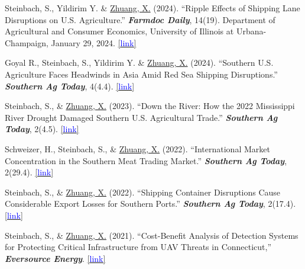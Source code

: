 \documentclass[10.5 pt,letterpaper]{article}
\renewenvironment{itemize}{
	\begin{list}{}{
			\setlength{\leftmargin}{1.5em}
		}
	}{
	\end{list}
}
\begin{document}
\begin{itemize}


	\item[-]   Steinbach, S., Yildirim Y. \& \underline{Zhuang, X.} (2024). ``Ripple Effects of Shipping Lane Disruptions on U.S. Agriculture.'' \textit{\textbf{Farmdoc Daily}}, 14(19). Department of Agricultural and Consumer Economics, University of Illinois at Urbana-Champaign, January 29, 2024.
\href{https://farmdocdaily.illinois.edu/2024/01/ripple-effects-of-shipping-lane-disruptions-on-u-s-agriculture.html}{[{\underline{\textcolor{blue}{link}}}]} 




	\item[-]  Goyal R., Steinbach, S., Yildirim Y. \& \underline{Zhuang, X.} (2024). ``Southern U.S. Agriculture Faces Headwinds in Asia Amid Red Sea Shipping Disruptions.'' \textit{\textbf{Southern Ag Today}}, 4(4.4).
\href{https://southernagtoday.org/2024/01/25/southern-u-s-agriculture-faces-headwinds-in-asia-amid-red-sea-shipping-disruptions/}{[{\underline{\textcolor{blue}{link}}}]} 



	
	\item[-] Steinbach, S., \& \underline{Zhuang, X.} (2023). ``Down the River: How the 2022 Mississippi River Drought Damaged Southern U.S. Agricultural Trade.'' \textit{\textbf{Southern Ag Today}}, 2(4.5).
	\href{https://southernagtoday.org/2023/05/04/down-the-river-how-the-2022-mississippi-river-drought-damaged/}{[{\underline{\textcolor{blue}{link}}}]} 
	
	\item[-] Schweizer, H., Steinbach, S., \& \underline{Zhuang, X.} (2022). ``International Market Concentration in the Southern Meat Trading Market.'' \textit{\textbf{Southern Ag Today}}, 2(29.4).
	\href{https://southernagtoday.org/2022/07/international-market-concentration-in-the-southern-meat-trading-market/}{[{\underline{\textcolor{blue}{link}}}]} 
	
	\item[-] Steinbach, S., \& \underline{Zhuang, X.} (2022). ``Shipping Container Disruptions Cause Considerable Export Losses for Southern Ports.'' \textit{\textbf{Southern Ag Today}}, 2(17.4).
	\href{https://southernagtoday.org/2022/04/shipping-container-disruptions-cause-considerable-export-losses-for-southern-ports/}{[{\underline{\textcolor{blue}{link}}}]} 
	
	\item[-] Steinbach, S., \& \underline{Zhuang, X.} (2021). ``Cost-Benefit Analysis of Detection Systems for Protecting Critical Infrastructure from UAV Threats in Connecticut,'' \textit{\textbf{Eversource Energy}}.
	\href{https://www.dropbox.com/s/hmnrb6rljgsyvei/UConn%20CBA%20Report%202021.pdf?dl=0}{[{\underline{\textcolor{blue}{link}}}]} 
	
	
\end{itemize}
\end{document}
